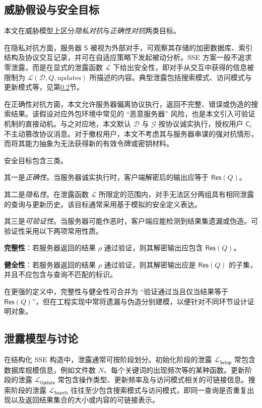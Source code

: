 \subsection{威胁假设与安全目标}
本文在威胁模型上区分\emph{隐私对抗}与\emph{正确性对抗}两类目标。

在隐私对抗方面，服务器 $\mathsf{S}$ 被视为外部对手，可观察其存储的加密数据库、索引结构及协议交互记录，并可在自适应策略下发起被动分析。SSE 方案一般不追求零泄露，而是在显式的泄露函数 $\mathcal{L}$ 下给出安全性，即对手从交互中获得的信息被限制为 $\mathcal{L}(\mathcal{D},Q,\text{updates})$ 所描述的内容。典型泄露包括搜索模式、访问模式与更新模式等，见第\ref{sec:leakage}节。

在正确性对抗方面，本文允许服务器偏离协议执行，返回不完整、错误或伪造的搜索结果。该假设对应外包环境中常见的 ``恶意服务器'' 风险，也是本文引入可验证机制的直接动机。与之对应地，本文默认 $\mathcal{D}$ 与 $\mathcal{G}$ 按协议诚实执行，授权用户 $\mathsf{C}_i$ 不主动篡改协议消息。对于撤权用户，本文不考虑其与服务器串谋的强对抗情形，而将其能力抽象为无法获得新的有效令牌或密钥材料。

安全目标包含三类。

其一是\emph{正确性}。当服务器诚实执行时，客户端解密后的输出应等于 $\mathsf{Res}(Q)$。

其二是\emph{隐私性}。在泄露函数 $\mathcal{L}$ 所限定的范围内，对手无法区分两组具有相同泄露的查询与更新历史。该目标通常采用基于模拟的安全定义表达。

其三是\emph{可验证性}。当服务器可能作恶时，客户端应能检测到结果集遗漏或伪造。可验证性采用以下两项常用性质。

\textbf{完整性}：若服务器返回的结果 $\rho$ 通过验证，则其解密输出应包含 $\mathsf{Res}(Q)$。

\textbf{健全性}：若服务器返回的结果 $\rho$ 通过验证，则其解密输出应是 $\mathsf{Res}(Q)$ 的子集，并且不应包含与查询不匹配的标识。

在更强的定义中，完整性与健全性可合并为 ``验证通过当且仅当结果等于 $\mathsf{Res}(Q)$''，但在工程实现中常将遗漏与伪造分别建模，以便针对不同环节设计证明对象。

\subsection{泄露模型与讨论}
\label{sec:leakage}
在结构化 SSE 构造中，泄露通常可按阶段划分。初始化阶段的泄露 $\mathcal{L}_{\mathsf{Setup}}$ 常包含数据库规模信息，例如文件数 $N$、每个关键词的出现频次等的某种函数。更新阶段的泄露 $\mathcal{L}_{\mathsf{Update}}$ 常包含操作类型、更新频率及与访问模式相关的可链接信息。搜索阶段的泄露 $\mathcal{L}_{\mathsf{Search}}$ 往往至少包含搜索模式与访问模式，即同一查询是否重复出现以及返回结果集合的大小或内容的可链接表示。\cite{cash2014}

